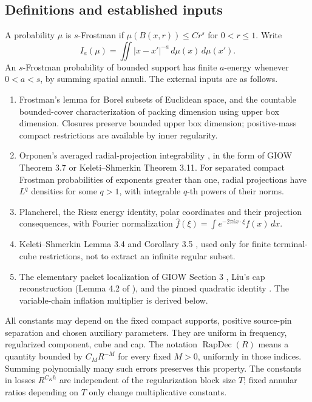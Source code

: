\documentclass[11pt]{article}
\theoremstyle{definition}\newtheorem{remark}[theorem]{Remark}
\newcommand{\dd}{\,d}\newcommand{\norm}[1]{\left\|#1\right\|}\newcommand{\eps}{\varepsilon}
\begin{document}
\subsection{Definitions and established inputs}
A probability \(\mu\) is \(s\)-Frostman if
\(\mu(B(x,r))\le C r^s\) for \(0<r\le1\). Write
$$
 I_a(\mu)=\iint |x-x'|^{-a}\dd\mu(x)\dd\mu(x').
$$
An \(s\)-Frostman probability of bounded support has finite \(a\)-energy
whenever \(0<a<s\), by summing spatial annuli.
The external inputs are as follows.
\begin{enumerate}
\item Frostman's lemma for Borel subsets of Euclidean space, and the
countable bounded-cover characterization of packing dimension using upper box dimension.
Closures preserve bounded upper box dimension; positive-mass compact restrictions
are available by inner regularity.
\item Orponen's averaged radial-projection integrability \cite{orponen}, in the form
of GIOW Theorem 3.7 or Keleti--Shmerkin Theorem 3.11. For separated compact
Frostman probabilities of exponents greater than one, radial projections have
\(L^q\) densities for some \(q>1\), with integrable \(q\)-th powers of their norms.
\item Plancherel, the Riesz energy identity, polar coordinates and their projection
consequences, with Fourier normalization
\(\widehat f(\xi)=\int e^{-2\pi i x\cdot\xi}f(x)\,dx\).
\item Keleti--Shmerkin Lemma 3.4 and Corollary 3.5 \cite{ks}, used only for finite
terminal-cube restrictions, not to extract an infinite regular subset.
\item The elementary packet localization of GIOW Section 3 \cite{giow},
Liu's cap reconstruction (Lemma 4.2 of \cite{liu2026}), and the pinned quadratic
identity \cite{liuidentity}. The variable-chain inflation multiplier is derived below.
\end{enumerate}
All constants may depend on the fixed compact supports, positive source-pin
separation and chosen auxiliary parameters. They are uniform in frequency,
regularized component, cube and cap. The notation \(\operatorname{RapDec}(R)\)
means a quantity bounded by \(C_MR^{-M}\) for every fixed \(M>0\), uniformly
in those indices. Summing polynomially many such errors preserves this property.
The constants in losses \(R^{C_Kh}\) are independent of the regularization block
size \(T\); fixed annular ratios depending on \(T\) only change multiplicative constants.

\clearpage


\end{document}
